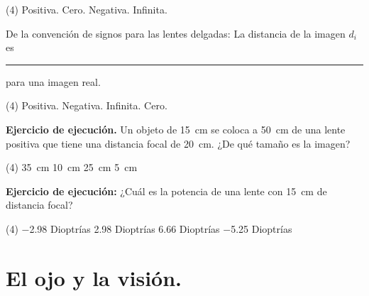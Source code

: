 \documentclass[12pt, letter]{exam}
\begin{document}
\begin{questions}
    \begin{tasks}(4)
        \task Positiva.
        \task Cero.
        \task Negativa.
        \task Infinita.
    \end{tasks}
    \question De la convención de signos para las lentes delgadas:  La distancia de la imagen $d_{i}$ es \rule{2cm}{0.1mm} para una imagen real.
    \begin{tasks}(4)
        \task Positiva.
        \task Negativa.
        \task Infinita.
        \task Cero.
    \end{tasks}
    \question \label{Problema_02} \textbf{Ejercicio de ejecución. } Un objeto de \SI{15}{\centi\meter} se coloca a \SI{50}{\centi\meter} de una lente positiva que tiene una distancia focal de \SI{20}{\centi\meter}. ¿De qué tamaño es la imagen?
    \begin{tasks}(4)
        \task \SI{35}{\centi\meter}
        \task \SI{10}{\centi\meter}
        \task \SI{25}{\centi\meter}
        \task \SI{5}{\centi\meter}
    \end{tasks}
    \question \label{Problema_03} \textbf{Ejercicio de ejecución: } ¿Cuál es la potencia de una lente con \SI{15}{\centi\meter} de distancia focal?
    \begin{tasks}(4)
        \task \num{-2.98} Dioptrías
        \task \num{2.98} Dioptrías
        \task \num{6.66} Dioptrías
        \task \num{-5.25} Dioptrías
    \end{tasks}

    \section{El ojo y la visión.}


\end{questions}
\end{document}
